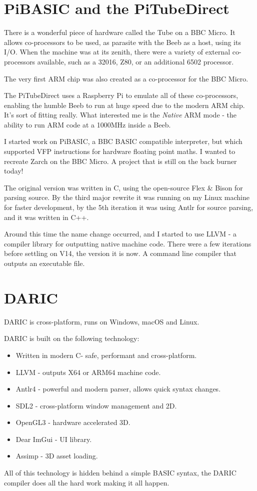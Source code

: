 \documentclass[10pt]{book}
\newcommand{\CC}{C\nolinebreak\hspace{-.05em}\raisebox{.4ex}{\tiny\bf +}\nolinebreak\hspace{-.10em}\raisebox{.4ex}{\tiny\bf +}}
\def\CC{{C\nolinebreak[4]\hspace{-.05em}\raisebox{.4ex}{\tiny\bf ++}}}
\newcommand{\DARIC}{DARIC}
\begin{document}
\section{PiBASIC and the PiTubeDirect}
\par{There is a wonderful piece of hardware called the Tube on a BBC Micro. It allows co-processors to be used, as parasite with the Beeb as a host, using its I/O. When the machine was at its zenith, there were a variety of external co-processors available, such as a 32016, Z80, or an additional 6502 processor.}
\par{The very first ARM chip was also created as a co-processor for the BBC Micro.}
\par{The PiTubeDirect uses a Raspberry Pi to emulate all of these co-processors, enabling the humble Beeb to run at huge speed due to the modern ARM chip. It's sort of fitting really. What interested me is the \emph{Native} ARM mode - the ability to run ARM code at a 1000MHz inside a Beeb.}
\par{I started work on PiBASIC, a BBC BASIC compatible interpreter, but which supported VFP instructions for hardware floating point maths. I wanted to recreate Zarch on the BBC Micro. A project that is still on the back burner today!}
\par{The original version was written in C, using the open-source Flex \& Bison for parsing source. By the third major rewrite it was running on my Linux machine for faster development, by the 5th iteration it was using Antlr for source parsing, and it was written in C++.}
\par{Around this time the name change occurred, and I started to use LLVM - a compiler library for outputting native machine code. There were a few iterations before settling on V14, the version it is now. A command line compiler that outputs an executable file.}

\section{\DARIC}
\par{\DARIC{} is cross-platform, runs on Windows, macOS and Linux.}
\par{\DARIC{} is built on the following technology:}
\begin{itemize}
\item Written in modern \CC - safe, performant and cross-platform.
\item LLVM - outputs X64 or ARM64 machine code. 
\item Antlr4 - powerful and modern parser, allows quick syntax changes. 
\item SDL2 - cross-platform window management and 2D. 
\item OpenGL3 - hardware accelerated 3D.
\item Dear ImGui - UI library.
\item Assimp - 3D asset loading.
\end{itemize}
\par{All of this technology is hidden behind a simple BASIC syntax, the \DARIC{} compiler does all the hard work making it all happen.}
\end{document}
